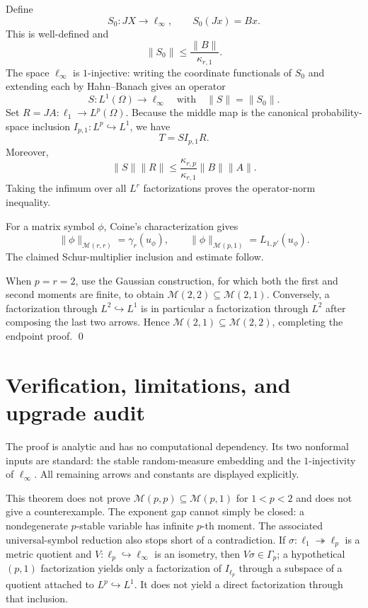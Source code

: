 \documentclass[11pt]{article}
\newcommand{\M}{\mathcal M}
\begin{document}
Define
\[
 S_0:JX\longrightarrow\ell_\infty,
 \qquad S_0(Jx)=Bx.
\]
This is well-defined and
\[
             \|S_0\|\le \frac{\|B\|}{\kappa_{r,1}}.
\]
The space $\ell_\infty$ is $1$-injective: writing the coordinate functionals
of $S_0$ and extending each by Hahn--Banach gives an operator
\[
 S:L^1(\Omega)\longrightarrow\ell_\infty
 \quad\text{with}\quad \|S\|=\|S_0\|.
\]
Set $R=JA:\ell_1\to L^p(\Omega)$.  Because the middle map is the canonical
probability-space inclusion $I_{p,1}:L^p\hookrightarrow L^1$, we have
\[
                    T=S I_{p,1}R.
\]
Moreover,
\[
 \|S\|\|R\|
 \le \frac{\kappa_{r,p}}{\kappa_{r,1}}\|B\|\|A\|.
\]
Taking the infimum over all $L^r$ factorizations proves the operator-norm
inequality.

For a matrix symbol $\phi$, Coine's characterization gives
\[
 \|\phi\|_{\M(r,r)}=\gamma_r(u_\phi),
 \qquad
 \|\phi\|_{\M(p,1)}=L_{1,p'}(u_\phi).
\]
The claimed Schur-multiplier inclusion and estimate follow.

When $p=r=2$, use the Gaussian construction, for which both the first and
second moments are finite, to obtain
$\M(2,2)\subseteq\M(2,1)$.  Conversely, a factorization through
$L^2\hookrightarrow L^1$ is in particular a factorization through $L^2$
after composing the last two arrows.  Hence
$\M(2,1)\subseteq\M(2,2)$, completing the endpoint proof. \qed

\section{Verification, limitations, and upgrade audit}

The proof is analytic and has no computational dependency.  Its two
nonformal inputs are standard: the stable random-measure embedding and the
$1$-injectivity of $\ell_\infty$.  All remaining arrows and constants are
displayed explicitly.

This theorem does not prove $\M(p,p)\subseteq\M(p,1)$ for $1<p<2$ and does
not give a counterexample.  The exponent gap cannot simply be closed: a
nondegenerate $p$-stable variable has infinite $p$-th moment.  The associated
universal-symbol reduction also stops short of a contradiction.  If
$\sigma:\ell_1\twoheadrightarrow\ell_p$ is a metric quotient and
$V:\ell_p\hookrightarrow\ell_\infty$ is an isometry, then
$V\sigma\in\Gamma_p$; a hypothetical $(p,1)$ factorization yields only a
factorization of $I_{\ell_p}$ through a subspace of a quotient attached to
$L^p\hookrightarrow L^1$.  It does not yield a direct factorization through
that inclusion.
\end{document}
